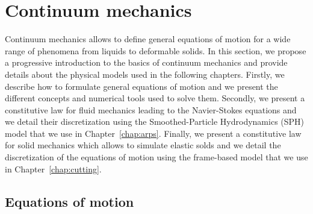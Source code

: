 \section{Continuum mechanics}

Continuum mechanics allows to define general equations of motion for a wide range of phenomena from liquids to deformable solids. 
In this section, we propose a progressive introduction to the basics of continuum mechanics and provide details about the physical models used in the following chapters.
Firstly, we describe how to formulate general equations of motion and we present the different concepts and numerical tools used to solve them.
Secondly, we present a constitutive law for fluid mechanics leading to the Navier-Stokes equations and we detail their discretization using the Smoothed-Particle Hydrodynamics (SPH) model that we use in Chapter~\ref{chap:arps}.
Finally, we present a constitutive law for solid mechanics which allows to simulate elastic solds and we detail the discretization of the equations of motion using the frame-based model that we use in Chapter~\ref{chap:cutting}.
%

\subsection{Equations of motion}

